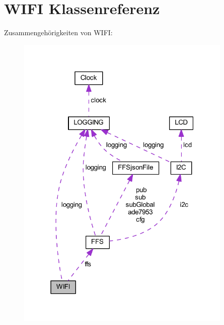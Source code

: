 \hypertarget{class_w_i_f_i}{}\section{W\+I\+FI Klassenreferenz}
\label{class_w_i_f_i}


Zusammengehörigkeiten von W\+I\+FI\+:
\nopagebreak
\begin{figure}[H]
\begin{center}
\leavevmode
\includegraphics[width=292pt]{class_w_i_f_i__coll__graph}
\end{center}
\end{figure}
